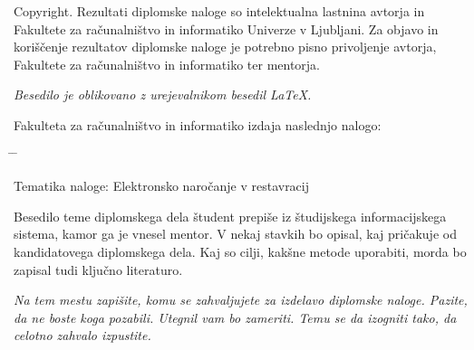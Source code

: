 \documentclass[a4paper, 12pt]{book}
\newcommand{\clearemptydoublepage}{\newpage{\pagestyle{empty}\cleardoublepage}}
\begin{document}
\noindent
{\sc Copyright}. 
Rezultati diplomske naloge so intelektualna lastnina avtorja in Fakultete za računalništvo in informatiko Univerze v Ljubljani.
Za objavo in koriščenje rezultatov diplomske naloge je potrebno pisno privoljenje avtorja, Fakultete za računalništvo in informatiko ter mentorja.

\begin{center}
\mbox{}\vfill
\emph{Besedilo je oblikovano z urejevalnikom besedil \LaTeX.}
\end{center}
\clearemptydoublepage

\thispagestyle{empty}
\vspace*{4cm}

\noindent
Fakulteta za računalništvo in informatiko izdaja naslednjo nalogo:
\medskip
\begin{tabbing}
\hspace{32mm}\= \hspace{6cm} \= \kill




Tematika naloge: Elektronsko naročanje v restavracij
\end{tabbing}
Besedilo teme diplomskega dela študent prepiše iz študijskega informacijskega sistema, kamor ga je vnesel mentor. V nekaj stavkih bo opisal, kaj pričakuje od kandidatovega diplomskega dela. Kaj so cilji, kakšne metode uporabiti, morda bo zapisal tudi ključno literaturo.
\vspace{15mm}






\vspace{2cm}

\clearemptydoublepage

\thispagestyle{empty}\mbox{}\vfill\null\it%
\noindent
Na tem mestu zapišite, komu se zahvaljujete za izdelavo diplomske naloge. Pazite, da ne boste koga pozabili. Utegnil vam bo zameriti. Temu se da izogniti tako, da celotno zahvalo izpustite.
\rm\normalfont

\clearemptydoublepage

\end{document}
